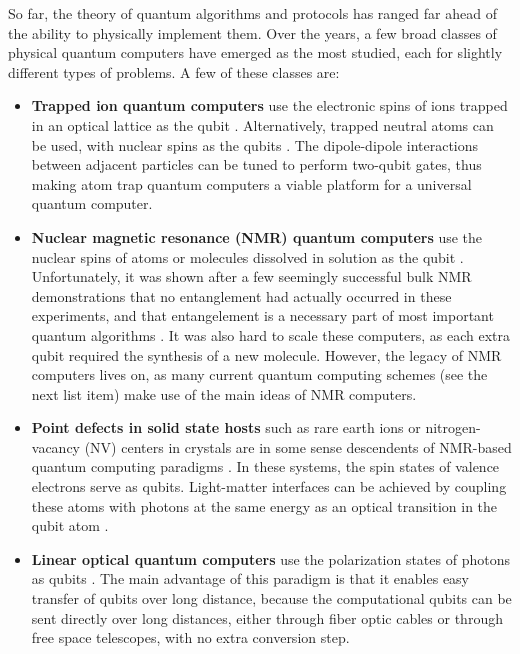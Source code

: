 \documentclass[12pt]{report}
\begin{document}
So far, the theory of quantum algorithms and protocols has ranged far ahead of the ability to physically implement them. Over the years, a few broad classes of physical quantum computers have emerged as the most studied, each for slightly different types of problems. A few of these classes are:
\newcommand{\listheader}[1]{\textbf{#1}}
\begin{itemize}
  
\item \listheader{Trapped ion quantum computers} use the electronic spins of ions trapped in an optical lattice as the qubit \cite{Cirac1995}. Alternatively, trapped neutral atoms can be used, with nuclear spins as the qubits \cite{Saskin2019}. The dipole-dipole interactions between adjacent particles can be tuned to perform two-qubit gates, thus making atom trap quantum computers a viable platform for a universal quantum computer.
  
\item \listheader{Nuclear magnetic resonance (NMR) quantum computers} use the nuclear spins of atoms or molecules dissolved in solution as the qubit \cite{Cory1997}. Unfortunately, it was shown after a few seemingly successful bulk NMR demonstrations that no entanglement had actually occurred in these experiments, and that entangelement is a necessary part of most important quantum algorithms \cite{Braunstein1999,Linden2001}. It was also hard to scale these computers, as each extra qubit required the synthesis of a new molecule. However, the legacy of NMR computers lives on, as many current quantum computing schemes (see the next list item) make use of the main ideas of NMR computers.
  
\item \listheader{Point defects in solid state hosts} such as rare earth ions or nitrogen-vacancy (NV) centers in crystals are in some sense descendents of NMR-based quantum computing paradigms \cite{Rose2018,Zhong2015}. In these systems, the spin states of valence electrons serve as qubits. Light-matter interfaces can be achieved by coupling these atoms with photons at the same energy as an optical transition in the qubit atom \cite{Togan2010,Bernien2013,Greve2012}. 

\item \listheader{Linear optical quantum computers} use the polarization states of photons as qubits \cite{Knill2001}. The main advantage of this paradigm is that it enables easy transfer of qubits over long distance, because the computational qubits can be sent directly over long distances, either through fiber optic cables or through free space telescopes, with no extra conversion step. 
    

\end{itemize}
\end{document}

